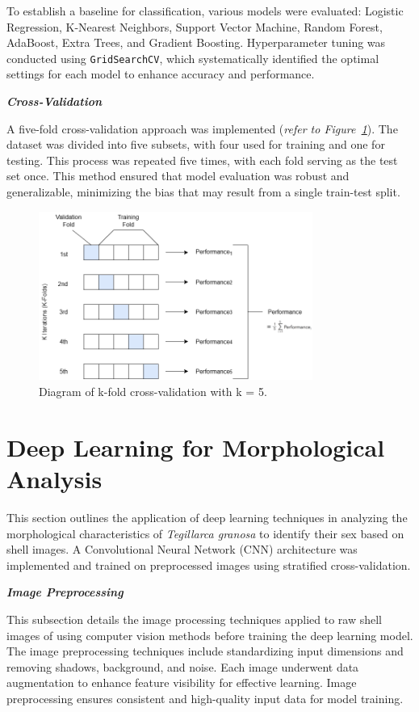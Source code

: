 To establish a baseline for classification, various models were evaluated: Logistic Regression, K-Nearest Neighbors, Support Vector Machine, Random Forest, AdaBoost, Extra Trees, and Gradient Boosting. Hyperparameter tuning was conducted using \texttt{GridSearchCV}, which systematically identified the optimal settings for each model to enhance accuracy and performance.

\textbf{\textit{Cross-Validation}}

A five-fold cross-validation approach was implemented (\textit{refer to Figure~\ref{fig:cv}}). The dataset was divided into five subsets, with four used for training and one for testing. This process was repeated five times, with each fold serving as the test set once. This method ensured that model evaluation was robust and generalizable, minimizing the bias that may result from a single train-test split. \cite{geeksforgeeks2024}

\newpage
\begin{figure}[!htbp]
	\centering
	\includegraphics[width=0.8\textwidth]{figures/cv.png}
	\caption{Diagram of k-fold cross-validation with k = 5.}
	\label{fig:cv}
\end{figure}

\section{Deep Learning for Morphological Analysis}
This section outlines the application of deep learning techniques in analyzing the morphological characteristics of \textit{Tegillarca granosa} to identify their sex based on shell images. A Convolutional Neural Network (CNN) architecture was implemented and trained on preprocessed images using stratified cross-validation.

\textbf{\textit{Image Preprocessing}}

This subsection details the image processing techniques applied to raw shell images of \Tgranosa using computer vision methods before training the deep learning model. The image preprocessing techniques include standardizing input dimensions and removing shadows, background, and noise. Each image underwent data augmentation to enhance feature visibility for effective learning. Image preprocessing ensures consistent and high-quality input data for model training.

